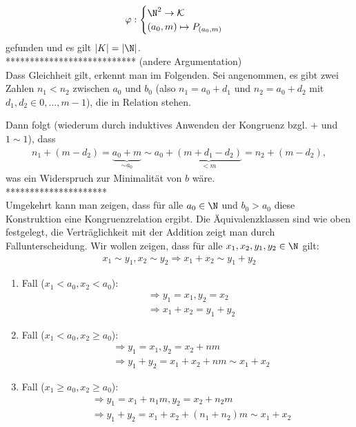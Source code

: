 \begin{solution}
\begin{itemize}
\begin{align*}
  \varphi: \begin{cases}
    \N^2 \rightarrow \mathcal{K} \\
    (a_0,m) \mapsto P_{(a_0,m)}
  \end{cases}
\end{align*}
gefunden und es gilt $|K| = |\N|$. \\
*************************** (andere Argumentation) \\
Dass Gleichheit gilt, erkennt man im Folgenden. Sei angenommen, es gibt zwei Zahlen $n_1 < n_2$ zwischen $a_0$ und $b_0$ (also $n_1 = a_0 + d_1$ und $n_2 = a_0 + d_2$ mit $d_1,d_2 \in {0,...,m-1}$), die in Relation stehen.

Dann folgt (wiederum durch induktives Anwenden der Kongruenz bzgl. $+$ und $1 \sim 1$), dass
\begin{align*}
n_1 + (m-d_2) = \underbrace{a_0 + m}_{\sim a_0} \sim a_0 + \underbrace{(m + d_1 - d_2)}_{<m} = n_2 + (m-d_2),
\end{align*}
was ein Widerspruch zur Minimalität von $b$ wäre.\\
********************* \\
Umgekehrt kann man zeigen, dass für alle $a_0 \in \N$ und $b_0 > a_0$ diese Konstruktion eine Kongruenzrelation ergibt. Die Äquivalenzklassen sind wie oben festgelegt, die Verträglichkeit mit der Addition zeigt man durch Fallunterscheidung.
Wir wollen zeigen, dass für alle $x_1,x_2,y_1,y_2 \in \N$ gilt:
\begin{align*}
  x_1 \sim y_1,x_2 \sim y_2 \Rightarrow x_1 + x_2 \sim y_1 + y_2
\end{align*}

\begin{enumerate}[label = \textit{\arabic*.}]
\item Fall ($x_1 < a_0, x_2 < a_0$):
\begin{align*}
  &\Rightarrow y_1 = x_1, y_2 = x_2 \\
  &\Rightarrow x_1 + x_2 = y_1 + y_2
\end{align*}
\item Fall ($x_1 < a_0, x_2 \geq a_0$):
\begin{align*}
  &\Rightarrow y_1 = x_1, y_2 = x_2 + nm \\
  &\Rightarrow  y_1 + y_2 = x_1 + x_2 + nm \sim x_1 + x_2
\end{align*}
\item Fall ($x_1 \geq a_0, x_2 \geq a_0$):
\begin{align*}
  &\Rightarrow y_1 = x_1 + n_1 m, y_2 = x_2 + n_2 m \\
  &\Rightarrow  y_1 + y_2 = x_1 + x_2 + (n_1+n_2) m \sim x_1 + x_2
\end{align*}
\end{enumerate}


\end{itemize}
\end{solution}

